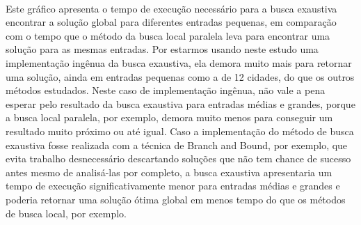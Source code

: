 \documentclass[11pt]{article}
\begin{document}
    \begin{center}
    \end{center}
    { \hspace*{\fill} \\}
    
    Este gráfico apresenta o tempo de execução necessário para a busca
exaustiva encontrar a solução global para diferentes entradas pequenas,
em comparação com o tempo que o método da busca local paralela leva para
encontrar uma solução para as mesmas entradas. Por estarmos usando neste
estudo uma implementação ingênua da busca exaustiva, ela demora muito
mais para retornar uma solução, ainda em entradas pequenas como a de 12
cidades, do que os outros métodos estudados. Neste caso de implementação
ingênua, não vale a pena esperar pelo resultado da busca exaustiva para
entradas médias e grandes, porque a busca local paralela, por exemplo,
demora muito menos para conseguir um resultado muito próximo ou até
igual. Caso a implementação do método de busca exaustiva fosse realizada
com a técnica de Branch and Bound, por exemplo, que evita trabalho
desnecessário descartando soluções que não tem chance de sucesso antes
mesmo de analisá-las por completo, a busca exaustiva apresentaria um
tempo de execução significativamente menor para entradas médias e
grandes e poderia retornar uma solução ótima global em menos tempo do
que os métodos de busca local, por exemplo.
\end{document}

